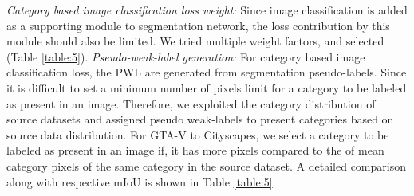 \documentclass[10pt,twocolumn,letterpaper]{article}
\begin{document}
\begin{comment}
\begin{table}[H]
\footnotesize
\centering
\caption{A comparative analysis of PWL generation with respect to mIoU.}
\begin{tabular}{ccccc}
\hline
\multicolumn{5}{c}{GTA-V  Cityscapes} \\
\hline
& 0.0  & 0.1        & 0.05       & 0.025                \\
mIoU (SISC-PWL)           &45.5    & 46.0       & 49.0       & 47.33   \\
\hline
\end{tabular}
\label{table:6}
\end{table}
\end{comment}
\textit{Category based image classification loss weight:} Since image classification is added as a supporting module to segmentation network, the loss contribution by this module should also be limited. We tried multiple weight factors, and selected  (Table \ref{table:5}).
\textit{Pseudo-weak-label generation:} For category based image classification loss, the PWL are generated from segmentation pseudo-labels. Since it is difficult to set a minimum number of pixels limit for a category to be labeled as present in an image. Therefore, we exploited the category distribution of source datasets and assigned pseudo weak-labels to present categories based on source data distribution. For GTA-V to Cityscapes, we select a category to be labeled as present in an image if, it has more pixels compared to the  of mean category pixels of the same category in the source dataset. 
A detailed comparison along with respective mIoU is shown in Table \ref{table:5}.

\vspace{-0.2cm}
\end{document}

